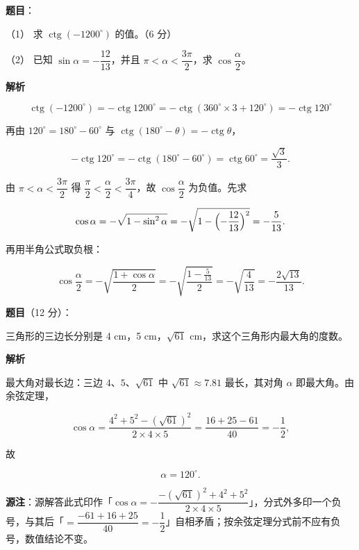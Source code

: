 \begin{answer}

\textbf{题目}：

（1） 求 $\operatorname{ctg}(-1200^\circ)$ 的值。（6 分）

（2） 已知 $\sin\alpha=-\dfrac{12}{13}$，并且 $\pi<\alpha<\dfrac{3\pi}{2}$，求 $\cos\dfrac{\alpha}{2}$。

\textbf{解析}


\nopagebreak[4]
\[
\operatorname{ctg}(-1200^\circ)
=-\operatorname{ctg}1200^\circ
=-\operatorname{ctg}(360^\circ\times3+120^\circ)
=-\operatorname{ctg}120^\circ
\]

再由 $120^\circ=180^\circ-60^\circ$ 与 $\operatorname{ctg}(180^\circ-\theta)=-\operatorname{ctg}\theta$，

\nopagebreak[4]
\[
-\operatorname{ctg}120^\circ
=-\operatorname{ctg}(180^\circ-60^\circ)
=\operatorname{ctg}60^\circ
=\frac{\sqrt3}{3}.
\]


由 $\pi<\alpha<\dfrac{3\pi}{2}$ 得 $\dfrac{\pi}{2}<\dfrac{\alpha}{2}<\dfrac{3\pi}{4}$，故 $\cos\dfrac{\alpha}{2}$ 为负值。先求

\nopagebreak[4]
\[
\cos\alpha
=-\sqrt{1-\sin^2\alpha}
=-\sqrt{1-\Bigl(-\frac{12}{13}\Bigr)^2}
=-\frac{5}{13}.
\]

再用半角公式取负根：

\nopagebreak[4]
\[
\cos\frac{\alpha}{2}
=-\sqrt{\frac{1+\cos\alpha}{2}}
=-\sqrt{\frac{1-\frac{5}{13}}{2}}
=-\sqrt{\frac{4}{13}}
=-\frac{2\sqrt{13}}{13}.
\]



\end{answer}
\begin{answer}

\textbf{题目}（12 分）：

三角形的三边长分别是 4 cm，5 cm，$\sqrt{61}$ cm，求这个三角形内最大角的度数。

\textbf{解析}

最大角对最长边：三边 $4$、$5$、$\sqrt{61}$ 中 $\sqrt{61}\approx7.81$ 最长，其对角 $\alpha$ 即最大角。由余弦定理，

\nopagebreak[4]
\[
\cos\alpha=\frac{4^2+5^2-(\sqrt{61})^2}{2\times4\times5}
=\frac{16+25-61}{40}
=-\frac12,
\]

故

\nopagebreak[4]
\[
\alpha=120^\circ.
\]

\begin{gktip}
\textbf{源注}：源解答此式印作「$\cos\alpha=-\dfrac{-(\sqrt{61})^2+4^2+5^2}{2\times4\times5}$」，分式外多印一个负号，与其后「$=\dfrac{-61+16+25}{40}=-\dfrac12$」自相矛盾；按余弦定理分式前不应有负号，数值结论不变。
\end{gktip}


\end{answer}
